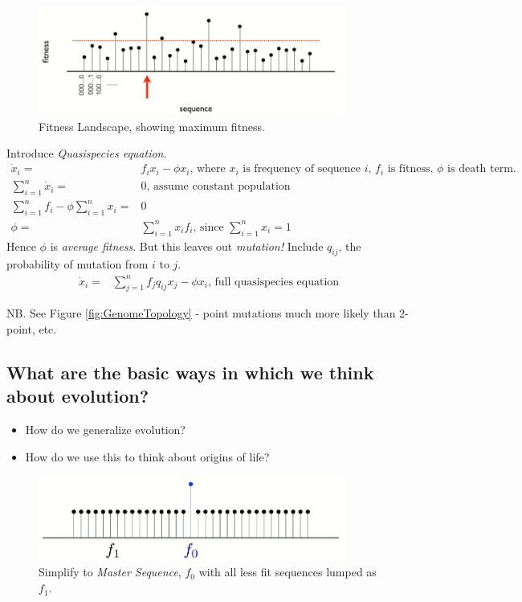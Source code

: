 \documentclass[]{article}
\begin{document}
\begin{figure}[H]
	\caption{Fitness Landscape, showing maximum fitness.}\label{fig:FitnessLandscape} 
	\includegraphics[width=0.9\textwidth]{FitnessLandscape}
\end{figure}

Introduce \emph{Quasispecies equation}.
\begin{align*}
\dot x_i =& f_i x_i - \phi x_i \text{, where $x_i$ is frequency of sequence $i$, $f_i$ is fitness, $\phi$ is death term.}\\
\sum_{i=1}^{n} \dot x_i =& 0 \text{, assume constant population}\\
\sum_{i=1}^{n} f_i - \phi \sum_{i=1}^{n} x_i =& 0\\
\phi =& \sum_{i=1}^{n}x_i f_i\text{, since $\sum_{i=1}^{n}x_i = 1$}
\end{align*}
Hence $\phi$ is \emph{average fitness}. But this leaves out \emph{mutation!} Include $q_{ij}$, the probability of mutation from $i$ to $j$.
\begin{align*}
\dot x_i =& \sum_{j=1}^{n} f_j q_{ij}x_j - \phi x_i\text{, full quasispecies equation} 
\end{align*}

NB. See Figure \ref{fig:GenomeTopology} - point mutations much more likely than 2-point, etc.

\subsection{What are the basic ways in which we think about evolution?}

\begin{itemize}
	\item How do we generalize evolution?
	\item How do we use this to think about origins of life? 
\end{itemize}

\begin{figure}[H]
	\caption[Simplify to \emph{Master Sequence}]{Simplify to \emph{Master Sequence}, $f_0$ with all less fit sequences lumped as $f_1$.}\label{fig:SteadyStateSolution} 
	\includegraphics[width=0.9\textwidth]{SteadyStateSolution}
\end{figure}
\end{document}
